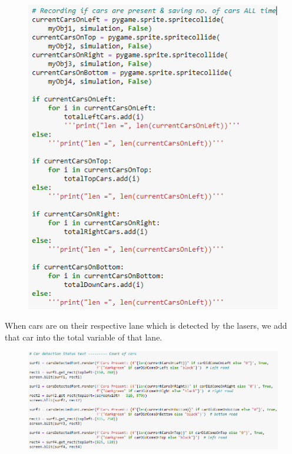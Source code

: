 \documentclass[12pt, a4paper,titlepage]{article}
\begin{document}
\begin{figure}[H]
	\centering
	\includegraphics[width=\linewidth]{images/a3}
	\caption{}
	\label{fig:a3}
\end{figure}

When cars are on their respective lane which is detected by the lasers, we add that car into the total variable of that lane.

\begin{figure}[H]
	\centering
	\includegraphics[width=\linewidth]{images/a4}
	\caption{}
	\label{fig:a4}
\end{figure}
\end{document}
